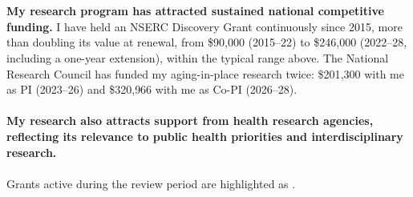 \documentclass[11pt]{article}
\begin{document}
\\ \\
\textbf{My research program has attracted sustained national competitive funding.} I have held an NSERC Discovery Grant continuously since 2015, more than doubling its value at renewal, from \$90{,}000 (2015--22) to \$246{,}000 (2022--28, including a one-year extension), within the typical range above. The National Research Council has funded my aging-in-place research twice: \$201{,}300 with me as PI (2023--26) and \$320{,}966 with me as Co-PI (2026--28).
\\ \\
\textbf{My research also attracts support from health research agencies, reflecting its relevance to public health priorities and interdisciplinary research.} \\ \\
Grants active during the review period are highlighted as .
\fi %









\sectionbreak
{}

\printgrants

\keepwithnext
{}
\printgrants[Submitted]
\end{document}
